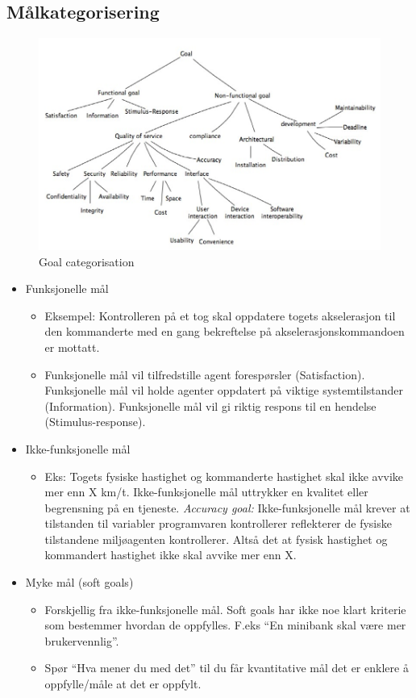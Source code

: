 \subsection{Målkategorisering}

\begin{figure}[htbp]
\centering
\includegraphics{Forelesning 02/img/goal-categorisation.png}
\caption{Goal categorisation}
\end{figure}

\begin{itemize}
\item
  Funksjonelle mål
  \begin{itemize}
  \item
    Eksempel: Kontrolleren på et tog skal oppdatere togets akselerasjon
    til den kommanderte med en gang bekreftelse på
    akselerasjonskommandoen er mottatt.
  \item
    Funksjonelle mål vil tilfredstille agent forespørsler
    (Satisfaction). Funksjonelle mål vil holde agenter oppdatert på
    viktige systemtilstander (Information). Funksjonelle mål vil gi
    riktig respons til en hendelse (Stimulus-response).
  \end{itemize}
\item
  Ikke-funksjonelle mål
  \begin{itemize}
  \item
    Eks: Togets fysiske hastighet og kommanderte hastighet skal ikke
    avvike mer enn X km/t. Ikke-funksjonelle mål uttrykker en kvalitet
    eller begrensning på en tjeneste. \emph{Accuracy goal:}
    Ikke-funksjonelle mål krever at tilstanden til variabler
    programvaren kontrollerer reflekterer de fysiske tilstandene
    miljøagenten kontrollerer. Altså det at fysisk hastighet og
    kommandert hastighet ikke skal avvike mer enn X.
  \end{itemize}
\item
  Myke mål (soft goals)
  \begin{itemize}
  \item
    Forskjellig fra ikke-funksjonelle mål. Soft goals har ikke noe klart
    kriterie som bestemmer hvordan de oppfylles. F.eks ``En minibank
    skal være mer brukervennlig''.
  \item
    Spør ``Hva mener du med det'' til du får kvantitative mål det er
    enklere å oppfylle/måle at det er oppfylt.
  \end{itemize}
\end{itemize}
